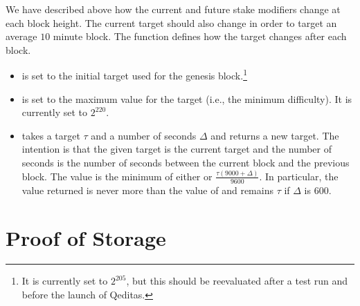 We have described above how the current and future stake modifiers
change at each block height.
The current target should also change in order to target an average $10$ minute
block. The function {} defines how the target changes
after each block.

\begin{itemize}
\item {} is set to the initial target used for the genesis block.\footnote{It is currently set to $2^{205}$, but this should be reevaluated after a test run and before the launch of Qeditas.}
\item {} is set to the maximum value for the target (i.e., the minimum difficulty). It
is currently set to $2^{220}$.
\item {} takes a target $\tau$ and a number of seconds $\Delta$ and returns a new target.
The intention is that the given target is the current target and the number of seconds
is the number of seconds between the current block and the previous block.
The value is the minimum of either {} or
$\frac{\tau (9000 + \Delta)}{9600}$.
In particular, the value returned is never more than the value of {}
and remains $\tau$ if $\Delta$ is 600.
\end{itemize}

\section{Proof of Storage}


